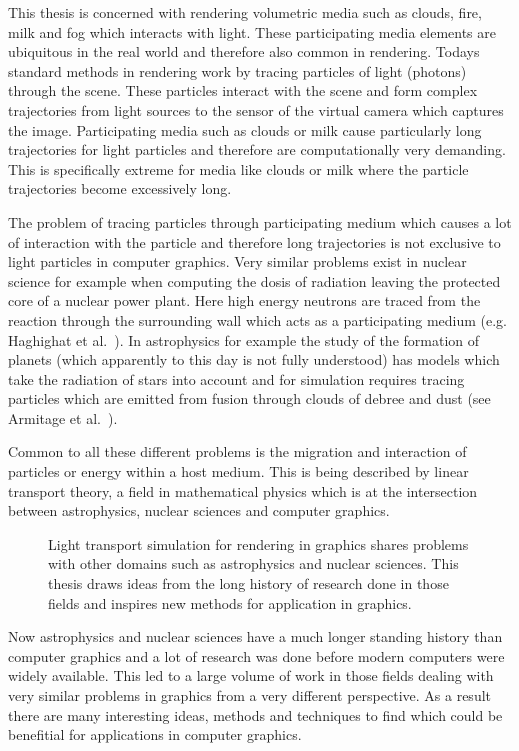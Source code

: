 This thesis is concerned with rendering volumetric media such as clouds, fire, milk and fog which interacts with light. These participating media elements are ubiquitous in the real world and therefore also common in rendering. Todays standard methods in rendering work by tracing particles of light (photons) through the scene. These particles interact with the scene and form complex trajectories from light sources to the sensor of the virtual camera which captures the image. Participating media such as clouds or milk cause particularly long trajectories for light particles and therefore are computationally very demanding. This is specifically extreme for media like clouds or milk where the particle trajectories become excessively long.


The problem of tracing particles through participating medium which causes a lot of interaction with the particle and therefore long trajectories is not exclusive to light particles in computer graphics. Very similar problems exist in nuclear science for example when computing the dosis of radiation leaving the protected core of a nuclear power plant. Here high energy neutrons are traced from the reaction through the surrounding wall which acts as a participating medium (e.g. Haghighat et al.~\cite{Haghighat03}). In astrophysics for example the study of the formation of planets (which apparently to this day is not fully understood) has models which take the radiation of stars into account and for simulation requires tracing particles which are emitted from fusion through clouds of debree and dust (see Armitage et al.~\cite{Armitage11}).

Common to all these different problems is the migration and interaction of particles or energy within a host medium. This is being described by linear transport theory, a field in mathematical physics which is at the intersection between astrophysics, nuclear sciences and computer graphics.
\begin{figure}[ht]
\centering
{}
\caption{Light transport simulation for rendering in graphics shares problems with other domains such as astrophysics and nuclear sciences. This thesis draws ideas from the long history of research done in those fields and inspires new methods for application in graphics.}
\label{fig:intro_linear_transport_fields}
\end{figure}

Now astrophysics and nuclear sciences have a much longer standing history than computer graphics and a lot of research was done before modern computers were widely available. This led to a large volume of work in those fields dealing with very similar problems in graphics from a very different perspective. As a result there are many interesting ideas, methods and techniques to find which could be benefitial for applications in computer graphics.

